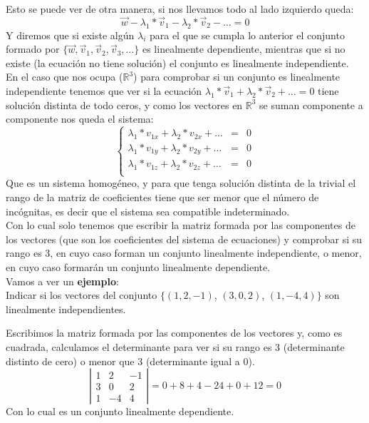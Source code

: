 \documentclass[a4paper,11pt,answers]{exam}
\begin{document}
Esto se puede ver de otra manera, si nos llevamos todo al lado izquierdo queda:
\[\vec w - \lambda_1 * \vec v_1 - \lambda_2 *\vec v_2 - \dots = 0\]
Y diremos que si existe algún $\lambda_i$ para el que se cumpla lo anterior el conjunto formado por
$\{\vec w, \vec{v}_1, \vec v_2, \vec v_3, \dots\}$ es linealmente dependiente, mientras que si no existe (la ecuación no tiene solución) el conjunto es linealmente independiente.\\

En el caso que nos ocupa ($\mathbb{R}^3$) para comprobar si un conjunto es linealmente independiente tenemos que ver si la ecuación $\lambda_1 *\vec v_1 + \lambda_2 *\vec v_2 + \dots = 0$ tiene solución distinta de todo ceros, y como los vectores en $\mathbb{R}^3$ se suman componente a componente nos queda el sistema:
\[\left\lbrace\begin{array}{lll}
	\lambda_1 * v_{1x} + \lambda_2 *v_{2x} + \dots &=& 0\\
	\lambda_1 *v_{1y} + \lambda_2 *v_{2y} + \dots &=& 0\\
	\lambda_1 *v_{1z} + \lambda_2 *v_{2z} + \dots &=& 0\\
\end{array}\right.\]
Que es un sistema homogéneo, y para que tenga solución distinta de la trivial el rango de la matriz de coeficientes tiene que ser menor que el número de incógnitas, es decir que el sistema sea compatible indeterminado.\\
Con lo cual solo tenemos que escribir la matriz formada por las componentes de los vectores (que son los coeficientes del sistema de ecuaciones) y comprobar si su rango es 3, en cuyo caso forman un conjunto linealmente independiente, o menor, en cuyo caso formarán un conjunto linealmente dependiente.\\

Vamos a ver un \textbf{ejemplo}:\\
Indicar si los vectores del conjunto $\{(1, 2, -1)$, $(3, 0, 2)$, $(1, -4, 4)\}$ son linealmente independientes.
\begin{solution}
	Escribimos la matriz formada por las componentes de los vectores y, como es cuadrada, calculamos el determinante para ver si su rango es 3 (determinante distinto de cero) o menor que 3 (determinante igual a 0).
	\[\left|\begin{array}{rrr}
		1&2&-1\\
		3&0&2\\
		1&-4&4
	\end{array}\right| = 0 + 8 + 4 - 24 + 0 + 12 = 0\]
	Con lo cual es un conjunto linealmente dependiente.
\end{solution}
\end{document}
